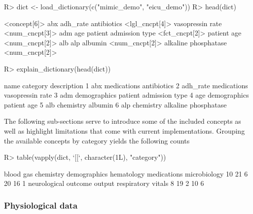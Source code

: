 \documentclass[
]{jss}
\begin{document}
\begin{CodeChunk}
\begin{CodeInput}
R> dict <- load_dictionary(c("mimic_demo", "eicu_demo"))
R> head(dict)
\end{CodeInput}
\begin{CodeOutput}
<concept[6]>
                                  abx                              adh_rate 
           antibiotics <lgl_cncpt[4]>       vasopressin rate <num_cncpt[3]> 
                                  adm                                   age 
patient admission type <fct_cncpt[2]>            patient age <num_cncpt[2]> 
                                  alb                                   alp 
               albumin <num_cncpt[2]>   alkaline phosphatase <num_cncpt[2]> 
\end{CodeOutput}
\begin{CodeInput}
R> explain_dictionary(head(dict))
\end{CodeInput}
\begin{CodeOutput}
      name     category            description
1      abx  medications            antibiotics
2 adh_rate  medications       vasopressin rate
3      adm demographics patient admission type
4      age demographics            patient age
5      alb    chemistry                albumin
6      alp    chemistry   alkaline phosphatase
\end{CodeOutput}
\end{CodeChunk}

The following sub-sections serve to introduce some of the included
concepts as well as highlight limitations that come with current
implementations. Grouping the available concepts by category yields the
following counts

\begin{CodeChunk}
\begin{CodeInput}
R> table(vapply(dict, `[[`, character(1L), "category"))
\end{CodeInput}
\begin{CodeOutput}

   blood gas    chemistry demographics   hematology  medications microbiology 
          10           21            6           20           16            1 
neurological      outcome       output  respiratory       vitals 
           8           19            2           10            6 
\end{CodeOutput}
\end{CodeChunk}

\hypertarget{physiological-data}{%
\subsubsection{Physiological data}\label{physiological-data}}
\end{document}
